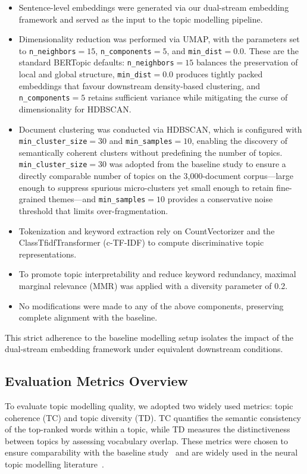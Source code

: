 \documentclass[authorproof,JACIII,researchpaper]{fujipressarticle}
\begin{document}
\begin{itemize}[leftmargin=*,itemsep=2pt]
    \item Sentence-level embeddings were generated via our dual-stream embedding framework and served as the input to the topic modelling pipeline.

    \item Dimensionality reduction was performed via UMAP, with the parameters set to \texttt{n\_neighbors}$=15$, \texttt{n\_components}$=5$, and \texttt{min\_dist}$=0.0$. These are the standard BERTopic defaults: \texttt{n\_neighbors}$=15$ balances the preservation of local and global structure, \texttt{min\_dist}$=0.0$ produces tightly packed embeddings that favour downstream density-based clustering, and \texttt{n\_components}$=5$ retains sufficient variance while mitigating the curse of dimensionality for HDBSCAN.

    \item Document clustering was conducted via HDBSCAN, which is configured with \texttt{min\_cluster\_size}$=30$ and \texttt{min\_samples}$=10$, enabling the discovery of semantically coherent clusters without predefining the number of topics. \texttt{min\_cluster\_size}$=30$ was adopted from the baseline study to ensure a directly comparable number of topics on the 3{,}000-document corpus---large enough to suppress spurious micro-clusters yet small enough to retain fine-grained themes---and \texttt{min\_samples}$=10$ provides a conservative noise threshold that limits over-fragmentation.

    \item Tokenization and keyword extraction rely on CountVectorizer and the ClassTfidfTransformer (c-TF-IDF) to compute discriminative topic representations.

    \item To promote topic interpretability and reduce keyword redundancy, maximal marginal relevance (MMR) was applied with a diversity parameter of 0.2.

    \item No modifications were made to any of the above components, preserving complete alignment with the baseline.
\end{itemize}

This strict adherence to the baseline modelling setup isolates the impact of the dual-stream embedding framework under equivalent downstream conditions.

\subsection{Evaluation Metrics Overview}
To evaluate topic modelling quality, we adopted two widely used metrics: topic coherence (TC) and topic diversity (TD). TC quantifies the semantic consistency of the top-ranked words within a topic, while TD measures the distinctiveness between topics by assessing vocabulary overlap. These metrics were chosen to ensure comparability with the baseline study~\cite{lezhnina_depression_2023} and are widely used in the neural topic modelling literature~\cite{dieng_topic_2020,mimno_optimizing_2011,roder_exploring_2015}.
\end{document}
